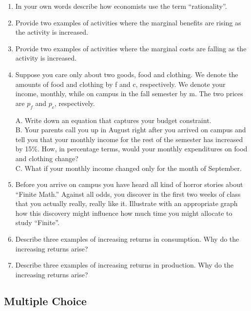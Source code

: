 \documentclass[
]{book}
\begin{document}
\begin{enumerate}
\def\labelenumi{\arabic{enumi}.}
\item
  In your own words describe how economists use the term ``rationality''.
\item
  Provide two examples of activities where the marginal benefits are rising as the activity is increased.
\item
  Provide two examples of activities where the marginal costs are falling as the activity is increased.
\item
  Suppose you care only about two goods, food and clothing. We denote the amounts of food and clothing by f and c, respectively. We denote your income, monthly, while on campus in the fall semester by m. The two prices are \(p_f\) and \(p_c\), respectively.

  A. Write down an equation that captures your budget constraint.\\
  B. Your parents call you up in August right after you arrived on campus and tell you that your monthly income for the rest of the semester has increased by 15\%. How, in percentage terms, would your monthly expenditures on food and clothing change?\\
  C. What if your monthly income changed only for the month of September.
\item
  Before you arrive on campus you have heard all kind of horror stories about ``Finite Math.'' Against all odds, you discover in the first two weeks of class that you actually really, really like it. Illustrate with an appropriate graph how this discovery might influence how much time you might allocate to study ``Finite''.
\item
  Describe three examples of increasing returns in consumption. Why do the increasing returns arise?
\item
  Describe three examples of increasing returns in production. Why do the increasing returns arise?
\end{enumerate}

\hypertarget{multiple-choice-3}{%
\subsection{Multiple Choice}\label{multiple-choice-3}}
\end{document}
